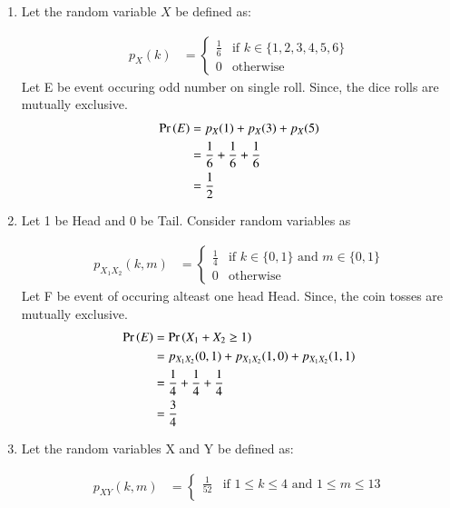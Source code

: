 \documentclass[journal,12pt,twocolumn]{IEEEtran}
\theoremstyle{remark}
\begin{document}
\begin{enumerate}
\item Let the random variable $X$ be defined as:
\begin{table}[!ht]
	
\end{table}
   \begin{align}
        p_X(k) &= 
        \begin{cases}
            \frac{1}{6} & \text{if }k \in \{1, 2, 3, 4, 5, 6\}\\
            0 & \text{otherwise}
        \end{cases}\label{eq:1}
    \end{align}
 Let E be event occuring odd number on single roll. Since, the dice rolls are mutually exclusive.
 \begin{align}
 \Pr\left(E\right)&=p_X(1)+p_X(3)+p_X(5)\\
 &=\frac{1}{6}+\frac{1}{6}+\frac{1}{6}\\
 &=\frac{1}{2} 
 \end{align}
 \item Let 1 be Head and 0 be Tail. Consider random variables as
 \begin{table}[!ht]
	
\end{table}
\begin{align}
        p_{X_1X_2}(k,m) &= 
        \begin{cases}
            \frac{1}{4} & \text{if }k \in \{0,1\} \text{ and }m \in \{0,1\}\\
            0 & \text{otherwise}
        \end{cases}\label{eq:2}
    \end{align}
Let F be event of occuring alteast one head Head. Since, the coin tosses are mutually exclusive. 
  \begin{align}
 \Pr\left(E\right)&=\Pr\left(X_1+X_2 \geq 1\right)\\
 &=p_{X_1X_2}(0,1)+p_{X_1X_2}(1,0)+p_{X_1X_2}(1,1)\\
 &=\frac{1}{4}+\frac{1}{4}+\frac{1}{4}\\
 &=\frac{3}{4} 
 \end{align}
\item Let the random variables X and Y be defined as:
\begin{table}[!ht]
	
\end{table}
\begin{align}
p_{XY}(k,m) &= 
        \begin{cases}
            \frac{1}{52} & \text{if }1 \leq k \leq 4 \text{ and }1 \leq m \leq 13 \\

\end{cases}
\end{align}
\end{enumerate}
\end{document}
